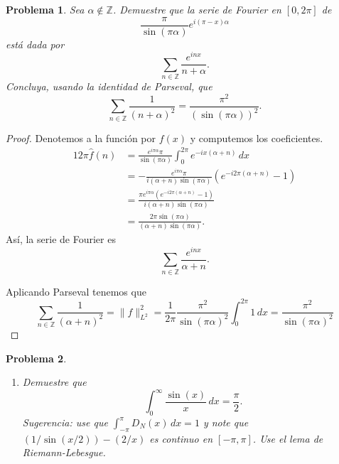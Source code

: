 \documentclass{article}
\theoremstyle{plain}
\newtheorem{Problema}{Problema}
\theoremstyle{definition}
\newcommand{\Z}{\mathbb{Z}}
\newcommand{\normL}[2]{\lVert #2 \rVert_{L^#1}}
\begin{document}
\begin{Problema}
  Sea \(\alpha \not\in \Z\). Demuestre que la serie de Fourier en \([0,2\pi]\) de
  \begin{displaymath}
    \frac{\pi}{\sin(\pi\alpha)} e^{i(\pi-x)\alpha}
  \end{displaymath}
  está dada por
  \begin{displaymath}
    \sum_{n\in\Z} \frac{e^{inx}}{n+\alpha}.
  \end{displaymath}
  Concluya, usando la identidad de Parseval, que
  \begin{displaymath}
    \sum_{n\in\Z} \frac{1}{(n+\alpha)^2}
    =
    \frac{\pi^2}{(\sin(\pi\alpha))^2}.
  \end{displaymath}
\end{Problema}
\begin{proof}
  Denotemos a la función por \(f(x)\) y computemos los coeficientes.
  \begin{alignat*}{1}
    2\pi \hat f(n)
    &= 
    \frac{ e^{i\pi\alpha}\pi }{ \sin(\pi\alpha) }
    \int_{0}^{2\pi} 
      e^{-ix(\alpha+n)} \, dx
    \\&= 
    - \frac{ e^{i\pi\alpha}\pi }{ i(\alpha+n) \sin(\pi\alpha) } 
    ( e^{-i2\pi(\alpha+n)} - 1 ) 
    \\&= 
    \frac{\pi e^{i\pi\alpha} (e^{-i2\pi(\alpha+n)}-1)}{i(\alpha+n) \sin(\pi\alpha)}
    \\&= 
    \frac{2\pi \sin(\pi\alpha)}{(\alpha+n) \sin(\pi\alpha)}.
  \end{alignat*}
  Así, la serie de Fourier es
  \begin{displaymath}
    \sum_{n\in\Z} \frac{e^{inx}}{\alpha+n}.
  \end{displaymath}

  Aplicando Parseval tenemos que
  \begin{displaymath}
    \sum_{n\in\Z} \frac{1}{(\alpha+n)^2}
    =
    \normL{2}{f}^2
    =
    \frac{1}{2\pi}
    \frac{\pi^2}{\sin(\pi\alpha)^2}
    \int_{0}^{2\pi} 1\, dx
    =
    \frac{\pi^2}{\sin(\pi\alpha)^2}
  \end{displaymath}
\end{proof}

\begin{Problema}
\begin{enumerate}
  \item Demuestre que
  \begin{displaymath}
    \int_{0}^{\infty} \frac{\sin(x)}{x} \, dx = \frac{\pi}{2}.
  \end{displaymath}
  \textit{Sugerencia:} use que \(\int_{-\pi}^{\pi} D_N(x) \, dx = 1\) y note que
  \((1/\sin(x/2)) - (2/x)\) es continuo en \([-\pi,\pi]\). Use el lema de Riemann-Lebesgue.  
\end{enumerate}
\end{Problema}
\end{document}
